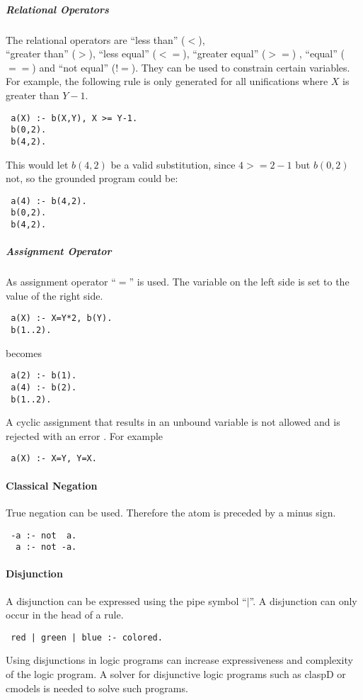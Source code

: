 \documentclass[a4paper,10pt]{article}
\begin{document}
\subparagraph{Relational Operators}
The relational operators are ``less than'' ($<$),\\ ``greater than'' ($>$), ``less equal'' ($<=$), ``greater equal'' ($>=$) , ``equal'' ($==$) and ``not equal'' ($!=$).
They can be used to constrain certain variables.
For example, the following rule is only generated for all unifications where $X$ is greater than $Y-1$.
\begin{verbatim}
 a(X) :- b(X,Y), X >= Y-1.
 b(0,2).
 b(4,2).
\end{verbatim}
This would let $b(4,2)$ be a valid substitution, since $4 >= 2-1$ but $b(0,2)$ not, so the grounded program could be:
\begin{verbatim}
 a(4) :- b(4,2).
 b(0,2).
 b(4,2).
\end{verbatim}

\subparagraph{Assignment Operator}
As assignment operator ``$=$'' is used.
The variable on the left side is set to the value of the right side.
\begin{verbatim}
 a(X) :- X=Y*2, b(Y).
 b(1..2).
\end{verbatim}
becomes
\begin{verbatim}
 a(2) :- b(1).
 a(4) :- b(2).
 b(1..2).
\end{verbatim}
A cyclic assignment that results in an unbound variable is not allowed and is rejected with an error . For example
\begin{verbatim}
 a(X) :- X=Y, Y=X.
\end{verbatim}

\paragraph{Classical Negation}
True negation can be used. Therefore the atom is preceded by a minus sign.
\begin{verbatim}
 -a :- not  a.
  a :- not -a. 
\end{verbatim}
\paragraph{Disjunction}
A disjunction can be expressed using the pipe symbol ``$\mid$''.
A disjunction can only occur in the head of a rule.
\begin{verbatim}
 red | green | blue :- colored.
\end{verbatim}
Using disjunctions in logic programs can increase expressiveness and complexity of the logic program.
A solver for disjunctive logic programs such as claspD \cite{claspD} or cmodels \cite{cmodels} is needed to solve such programs.
\end{document}
